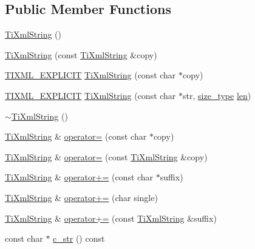 \subsection*{Public Member Functions}
\begin{DoxyCompactItemize}
\item 
\hyperlink{class_ti_xml_string_a342f61e0fc2244df300b73aedf6d3fef}{Ti\-Xml\-String} ()
\item 
\hyperlink{class_ti_xml_string_ac80fe17693a438c9ab2591664743fcb6}{Ti\-Xml\-String} (const \hyperlink{class_ti_xml_string}{Ti\-Xml\-String} \&copy)
\item 
\hyperlink{tinystr_8h_ae341476cd6b94ee32e3e93110a759581}{T\-I\-X\-M\-L\-\_\-\-E\-X\-P\-L\-I\-C\-I\-T} \hyperlink{class_ti_xml_string_aa3b32bd2891a757c9f36c21db44c81d2}{Ti\-Xml\-String} (const char $\ast$copy)
\item 
\hyperlink{tinystr_8h_ae341476cd6b94ee32e3e93110a759581}{T\-I\-X\-M\-L\-\_\-\-E\-X\-P\-L\-I\-C\-I\-T} \hyperlink{class_ti_xml_string_a4b17ea5c5db986f14827223dfa8f1547}{Ti\-Xml\-String} (const char $\ast$str, \hyperlink{class_ti_xml_string_abeb2c1893a04c17904f7c06546d0b971}{size\-\_\-type} \hyperlink{glew_8h_a652168017ea9a8bbcead03d5c16269fb}{len})
\item 
\hyperlink{class_ti_xml_string_a7ac03f581ca3422c4808162ab14f3450}{$\sim$\-Ti\-Xml\-String} ()
\item 
\hyperlink{class_ti_xml_string}{Ti\-Xml\-String} \& \hyperlink{class_ti_xml_string_ae0bc6147afc0ec2aa0da3a3c0a8fcfb0}{operator=} (const char $\ast$copy)
\item 
\hyperlink{class_ti_xml_string}{Ti\-Xml\-String} \& \hyperlink{class_ti_xml_string_ab1f1f5d3eceaa0f22d0a7e6055ea81b0}{operator=} (const \hyperlink{class_ti_xml_string}{Ti\-Xml\-String} \&copy)
\item 
\hyperlink{class_ti_xml_string}{Ti\-Xml\-String} \& \hyperlink{class_ti_xml_string_ab56336ac2aa2a08d24a71eb9a2b502a5}{operator+=} (const char $\ast$suffix)
\item 
\hyperlink{class_ti_xml_string}{Ti\-Xml\-String} \& \hyperlink{class_ti_xml_string_a6aa09d5240470b76d54ec709e04f8c13}{operator+=} (char single)
\item 
\hyperlink{class_ti_xml_string}{Ti\-Xml\-String} \& \hyperlink{class_ti_xml_string_afdcae5ea2b4d9e194dc21226b817f417}{operator+=} (const \hyperlink{class_ti_xml_string}{Ti\-Xml\-String} \&suffix)
\item 
const char $\ast$ \hyperlink{class_ti_xml_string_a5581ca641d915551d3cda90f8e7bf49b}{c\-\_\-str} () const 

\end{DoxyCompactItemize}
